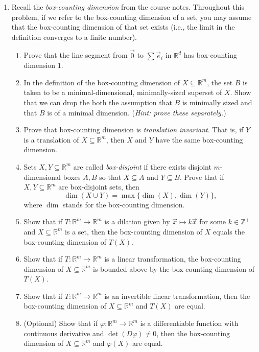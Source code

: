 \documentclass[letter]{article}
\newcommand{\R}{\mathbb{R}}
\newcommand{\Z}{\mathbb{Z}}
\begin{document}
\begin{enumerate}
		\item Recall the \emph{box-counting dimension} from the course notes. Throughout this problem, if we
			refer to the box-counting dimension of a set, you may assume that the box-counting dimension of that
			set exists (i.e., the limit in the definition converges to a finite number).
			\begin{enumerate}
				\item Prove that the line segment from $\vec 0$ to $\sum \vec e_i$ in $\R^d$ has box-counting dimension $1$.
				\item In the definition of the box-counting dimension of $X\subseteq \R^m$, 
					the set $B$ is taken to be a minimal-dimensional, minimally-sized 
					superset of $X$. Show that we can drop the both the
					assumption that $B$ is minimally sized and that $B$ is of a minimal dimension. (\emph{Hint: 
					prove these separately.})
				\item Prove that box-counting dimension is \emph{translation invariant}. That is, if $Y$ is
					a translation of $X\subseteq\R^m$, then $X$ and $Y$ have the same box-counting dimension.
				\item Sets $X,Y\subseteq \R^m$ are called \emph{box-disjoint} if there exists disjoint $m$-dimensional
					boxes $A,B$ so that $X\subseteq A$ and $Y\subseteq B$.
					Prove that if $X,Y\subseteq \R^m$ are box-disjoint sets, then 
					\[
						\dim(X\cup Y) = \max\{\dim(X),\dim(Y)\},
					\]
					where $\dim$ stands for the box-counting dimension.
				\item Show that
					if $T:\R^m\to\R^m$ is a dilation given by $\vec x\mapsto k\vec x$ for some $k\in\Z^+$ 
					and $X\subseteq \R^m$ is a set, then
					the box-counting dimension of $X$ equals the box-counting dimension of $T(X)$.
				\item Show that if $T:\R^m\to\R^m$ is a linear transformation, the box-counting dimension of
					$X\subseteq \R^m$ is bounded above by the box-counting dimension of $T(X)$.
				\item Show that if $T:\R^m\to\R^m$ is an invertible linear transformation, then the box-counting
					dimension of $X\subseteq\R^m$ and $T(X)$ are equal.
				\item (Optional) Show that if $\varphi:\R^m\to\R^m$ is a differentiable function
					with continuous derivative
					and $\det(D\varphi)\neq 0$, then the box-counting dimension of $X\subseteq \R^m$ and
					$\varphi(X)$ are equal.
			\end{enumerate}


	\end{enumerate}
\end{document}
